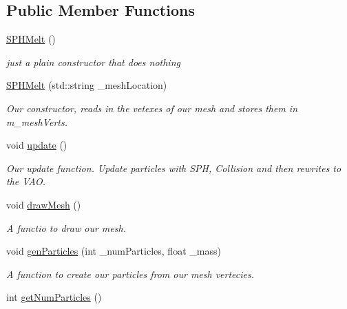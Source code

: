 \subsection*{Public Member Functions}
\begin{DoxyCompactItemize}
\item 
\hypertarget{classSPHMelt_abf63f796e20c65ea0792f3b57e9853c5}{\hyperlink{classSPHMelt_abf63f796e20c65ea0792f3b57e9853c5}{S\-P\-H\-Melt} ()}\label{classSPHMelt_abf63f796e20c65ea0792f3b57e9853c5}

\begin{DoxyCompactList}\small\item\em just a plain constructor that does nothing \end{DoxyCompactList}\item 
\hypertarget{classSPHMelt_af6fd66dad40740d7bb0af19ecfb650ea}{\hyperlink{classSPHMelt_af6fd66dad40740d7bb0af19ecfb650ea}{S\-P\-H\-Melt} (std\-::string \-\_\-mesh\-Location)}\label{classSPHMelt_af6fd66dad40740d7bb0af19ecfb650ea}

\begin{DoxyCompactList}\small\item\em Our constructor, reads in the vetexes of our mesh and stores them in m\-\_\-mesh\-Verts. \end{DoxyCompactList}\item 
\hypertarget{classSPHMelt_ac09f46a167ba1ce51e639eca54c2bc2a}{void \hyperlink{classSPHMelt_ac09f46a167ba1ce51e639eca54c2bc2a}{update} ()}\label{classSPHMelt_ac09f46a167ba1ce51e639eca54c2bc2a}

\begin{DoxyCompactList}\small\item\em Our update function. Update particles with S\-P\-H, Collision and then rewrites to the V\-A\-O. \end{DoxyCompactList}\item 
\hypertarget{classSPHMelt_a85a717d732a3e4be89d36cedb483d2ac}{void \hyperlink{classSPHMelt_a85a717d732a3e4be89d36cedb483d2ac}{draw\-Mesh} ()}\label{classSPHMelt_a85a717d732a3e4be89d36cedb483d2ac}

\begin{DoxyCompactList}\small\item\em A functio to draw our mesh. \end{DoxyCompactList}\item 
void \hyperlink{classSPHMelt_a64183bc720941736a9e3705fb896c993}{gen\-Particles} (int \-\_\-num\-Particles, float \-\_\-mass)
\begin{DoxyCompactList}\small\item\em A function to create our particles from our mesh vertecies. \end{DoxyCompactList}\item 
\hypertarget{classSPHMelt_a3d9da7029661124e3aabd1e24befa29d}{int \hyperlink{classSPHMelt_a3d9da7029661124e3aabd1e24befa29d}{get\-Num\-Particles} ()}\label{classSPHMelt_a3d9da7029661124e3aabd1e24befa29d}


\end{DoxyCompactItemize}

